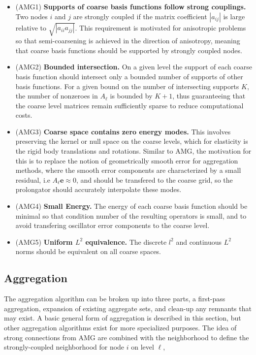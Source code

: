 \begin{itemize}
	\item (AMG1) \textbf{Supports of coarse basis functions follow strong couplings.} Two nodes $i$ and $j$ are strongly coupled if the matrix coefficient $|a_{ij}|$ is large relative to $\sqrt{|a_{ii}a_{jj}|}$. This requirement is motivated for anisotropic problems so that semi-coarsening is achieved in the direction of anisotropy, meaning that coarse basis functions should be supported by strongly coupled nodes.
	\item (AMG2) \textbf{Bounded intersection.} On a given level the support of each coarse basis function should intersect only a bounded number of supports of other basis functions. For a given bound on the number of intersecting supports $K$, the number of nonzeroes in $A_\ell$ is bounded by $K+1$, thus guaranteeing that the coarse level matrices remain sufficiently sparse to reduce computational costs.
	\item (AMG3) \textbf{Coarse space contains zero energy modes.} This involves preserving the kernel or null space on the coarse levels, which for elasticity is the rigid body translations and rotations. Similar to AMG, the motivation for this is to replace the notion of geometrically smooth error for aggregation methods, where the smooth error components are characterized by a small residual, i.e $A_\ell\mathbf{e} \approx 0$, and should be transfered to the coarse grid, so the prolongator should accurately interpolate these modes.
	\item (AMG4) \textbf{Small Energy.} The energy of each coarse basis function should be minimal so that condition number of the resulting operators is small, and to avoid transfering oscillator error components to the coarse level. %
	\item (AMG5) \textbf{Uniform $L^2$ equivalence.} The discrete $l^2$ and continuous $L^2$ norms should be equivalent on all coarse spaces.
\end{itemize}

\subsection{Aggregation}
The aggregation algorithm can be broken up into three parts, a first-pass aggregation, expansion of existing aggregate sets, and clean-up any remnants that may exist. A basic general form of aggregation is described in this section, but other aggregation algorithms exist for more specialized purposes. The idea of strong connections from AMG are combined with the neighborhood to define the strongly-coupled neighborhood for node $i$ on level $\ell$,

